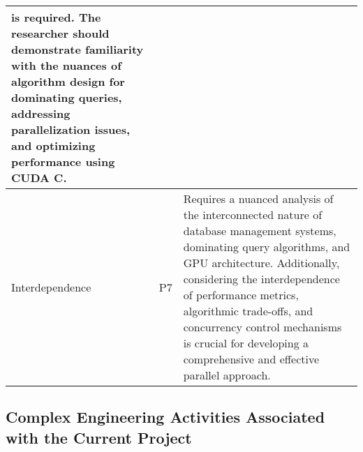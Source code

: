 \begin{longtable}{|m{5cm}|m{1cm}|m{8cm}|}
is required. The researcher should demonstrate familiarity with the
nuances of algorithm design for dominating queries, addressing parallelization issues, and optimizing performance using CUDA C. \\
\hline
Interdependence  & P7 & Requires a nuanced analysis of the interconnected nature of
database management systems, dominating query algorithms, and
GPU architecture. Additionally, considering the interdependence of
performance metrics, algorithmic trade-offs, and concurrency control mechanisms is crucial for developing a comprehensive and effective parallel approach. \\
\hline
\end{longtable}
\label{tab:Complex_Problem solving}


\subsection{Complex Engineering Activities Associated with the Current Project}



